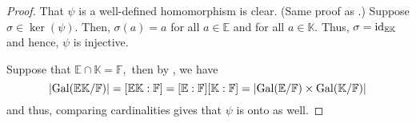\galoiscompositeproduct*\label{thm:galoiscompositeproduct2}
\begin{flushright}\hyperref[thm:galoiscompositeproduct]{\upsym}\end{flushright}
\begin{proof}
    That $\psi$ is a well-defined homomorphism is clear. (Same proof as .) Suppose $\sigma \in \ker(\psi).$ Then, $\sigma(a) = a$ for all $a \in \mathbb{E}$ and for all $a \in \mathbb{K}.$ Thus, $\sigma = \operatorname{id}_{\mathbb{E}\mathbb{K}}$ and hence, $\psi$ is injective.

    Suppose that $\mathbb{E} \cap \mathbb{K} = \mathbb{F},$ then by , we have
    \begin{equation*} 
        {\left\lvert \operatorname{Gal}(\mathbb{E}\mathbb{K}/\mathbb{F}) \right\lvert} = [\mathbb{E}\mathbb{K} : \mathbb{F}] = [\mathbb{E} : \mathbb{F}][\mathbb{K} : \mathbb{F}] = {\left\lvert \operatorname{Gal}(\mathbb{E}/\mathbb{F}) \times \operatorname{Gal}(\mathbb{K}/\mathbb{F}) \right\lvert}
    \end{equation*}
    and thus, comparing cardinalities gives that $\psi$ is onto as well.
\end{proof}

